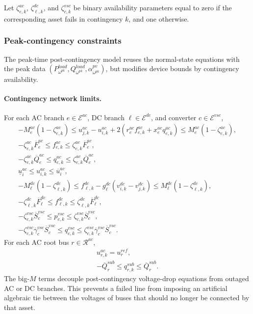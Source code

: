 Let \(\zeta_{e,k}^{ac}\), \(\zeta_{\ell,k}^{dc}\), and \(\zeta_{c,k}^{vsc}\) be binary availability parameters equal to zero if the corresponding asset fails in contingency \(k\), and one otherwise.

\subsubsection{Peak-contingency constraints}

The peak-time post-contingency model reuses the normal-state equations with the peak data \((P^{load}_{\omega^{pk}},Q^{load}_{\omega^{pk}},\alpha^{pv}_{\omega^{pk}})\), but modifies device bounds by contingency availability.

\paragraph{Contingency network limits.}
For each AC branch \(e\in\mathcal{E}^{ac}\), DC branch \(\ell\in\mathcal{E}^{dc}\), and converter \(c\in\mathcal{E}^{vsc}\),
\begin{align}
 -M_e^{ac}(1-\zeta_{e,k}^{ac}) \le u_{j,k}^{ac} - u_{i,k}^{ac} + 2\left(r_e^{ac} f_{e,k}^{ac} + x_e^{ac} q_{e,k}^{ac}\right) \le M_e^{ac}(1-\zeta_{e,k}^{ac}),
\label{eq:10b-cont-ac-drop}\\
-\zeta_{e,k}^{ac}\overline F_e^{ac} \le f_{e,k}^{ac} \le \zeta_{e,k}^{ac}\overline F_e^{ac},
\label{eq:10b-cont-ac-flow}\\
-\zeta_{e,k}^{ac}\overline Q_e^{ac} \le q_{e,k}^{ac} \le \zeta_{e,k}^{ac}\overline Q_e^{ac},
\label{eq:10b-cont-ac-reactive-flow}\\
\underline u_i^{ac} \le u_{i,k}^{ac} \le \overline u_i^{ac},
\label{eq:10b-cont-ac-voltage}\\
 -M_\ell^{dc}(1-\zeta_{\ell,k}^{dc}) \le f_{\ell,k}^{dc} - g_\ell^{dc}(v_{i,k}^{dc}-v_{j,k}^{dc}) \le M_\ell^{dc}(1-\zeta_{\ell,k}^{dc}),
\label{eq:10b-cont-dc-drop}\\
-\zeta_{\ell,k}^{dc}\overline F_\ell^{dc} \le f_{\ell,k}^{dc} \le \zeta_{\ell,k}^{dc}\overline F_\ell^{dc},
\label{eq:10b-cont-dc-flow}\\
 -\zeta_{c,k}^{vsc}\overline S_c^{vsc} \le p_{c,k}^{vsc} \le \zeta_{c,k}^{vsc}\overline S_c^{vsc},
\label{eq:10b-cont-vsc-bound}\\
-\zeta_{c,k}^{vsc}\overline\gamma_c^{vsc}\overline S_c^{vsc}
\le q_{c,k}^{vsc} \le
\zeta_{c,k}^{vsc}\overline\gamma_c^{vsc}\overline S_c^{vsc}.
\label{eq:10b-cont-vsc-reactive-bound}
\end{align}
For each AC root bus \(r\in\mathcal{R}^{ac}\),
\begin{align}
u_{r,k}^{ac} = u_r^{ref},
\label{eq:10b-cont-ac-root-voltage}\\
-\overline Q_r^{sub} \le q_{r,k}^{sub} \le \overline Q_r^{sub}.
\label{eq:10b-cont-substation-reactive-bounds}
\end{align}
The big-\(M\) terms decouple post-contingency voltage-drop equations from outaged AC or DC branches. This prevents a failed line from imposing an artificial algebraic tie between the voltages of buses that should no longer be connected by that asset.

